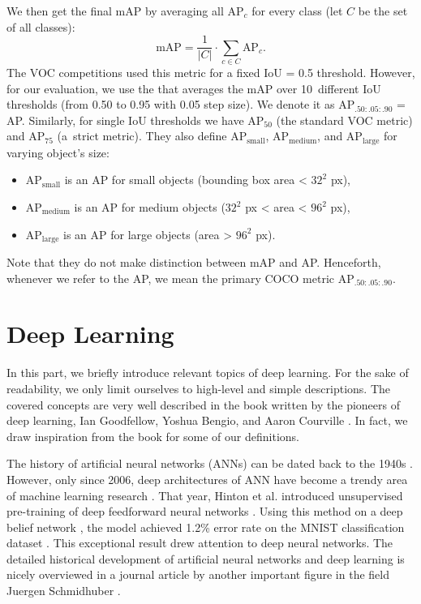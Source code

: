 We then get the final mAP by averaging all AP$_c$ for every class (let $C$ be
the set of all classes):
$$
    \text{mAP} = \frac{1}{\lvert C \rvert} \cdot \sum_{ c\in C} \text{AP}_c.
$$
The VOC competitions \cite{voc} used this metric for a fixed IoU = 0.5 threshold.
However, for our evaluation, we use the 
\cite{coco} that averages the mAP over 10~different IoU thresholds (from 0.50
to 0.95 with 0.05 step size). We denote it as AP$_{.50:.05:.90}$ = AP.
Similarly, for single IoU thresholds we have AP$_{50}$ (the standard VOC metric)
and AP$_{75}$ (a~strict metric). They also define AP$_\text{small}$,
AP$_\text{medium}$, and AP$_\text{large}$ for varying object's size:
\begin{itemize}
    \item AP$_\text{small}$ is an AP for small objects (bounding box area <
          $32^2$ px),
    \item AP$_\text{medium}$ is an AP for medium objects ($32^2$ px < area <
          $96^2$ px),
    \item AP$_\text{large}$ is an AP for large objects (area > $96^2$ px).
\end{itemize}
Note that they do not make distinction between mAP and AP. Henceforth, whenever
we refer to the AP, we mean the primary COCO metric AP$_{.50:.05:.90}$.

\section{Deep Learning}\label{deep_learning_chapter}


In this part, we briefly introduce relevant topics of deep learning. For the
sake of readability, we only limit ourselves to high-level and simple
descriptions. The covered concepts are very well described in the book written
by the pioneers of deep learning, Ian Goodfellow, Yoshua Bengio, and Aaron
Courville \cite{Goodfellow-et-al-2016}. In fact, we draw inspiration from the
book for some of our definitions.

The history of artificial neural networks (ANNs) can be dated back to the 1940s
\cite{McCulloch_1943}. However, only since 2006, deep architectures of ANN have
become a trendy area of machine learning research
\cite{DBLP:journals/corr/Schmidhuber14}. That year, Hinton et al. introduced
unsupervised pre-training of deep feedforward neural networks
\cite{hinton2006reducing}. Using this method on a deep belief network
\cite{DBN}, the model achieved 1.2\% error rate on the MNIST classification
dataset \cite{hinton2006fast, mnist}. This exceptional result drew attention
to deep neural networks. The detailed historical development of artificial
neural networks and deep learning is nicely overviewed in a journal article by
another important figure in the field Juergen Schmidhuber
\cite{DBLP:journals/corr/Schmidhuber14}.


